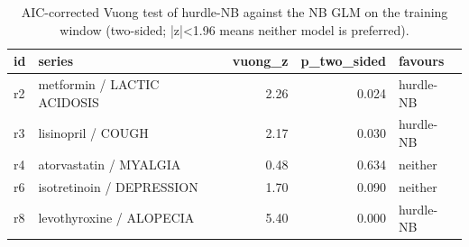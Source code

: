 \begin{table}

\caption{AIC-corrected Vuong test of hurdle-NB against the NB GLM on the training window (two-sided; |z|<1.96 means neither model is preferred).}
\centering
\begin{tabular}[t]{llrrl}
\toprule
id & series & vuong\_z & p\_two\_sided & favours\\
\midrule
r2 & metformin / LACTIC ACIDOSIS & 2.26 & 0.024 & hurdle-NB\\
r3 & lisinopril / COUGH & 2.17 & 0.030 & hurdle-NB\\
r4 & atorvastatin / MYALGIA & 0.48 & 0.634 & neither\\
r6 & isotretinoin / DEPRESSION & 1.70 & 0.090 & neither\\
r8 & levothyroxine / ALOPECIA & 5.40 & 0.000 & hurdle-NB\\
\bottomrule
\end{tabular}
\end{table}
